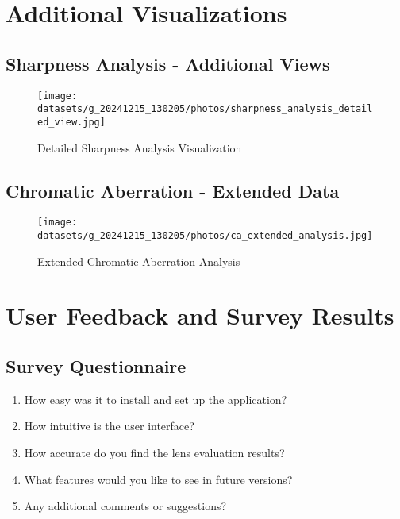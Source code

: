 
\chapter{Additional Visualizations}
\label{app:additional_visuals}

\section{Sharpness Analysis - Additional Views}
\begin{figure}[H]
    \centering
    \texttt{[image: datasets/g\_20241215\_130205/photos/sharpness\_analysis\_detailed\_view.jpg]}
    \caption{Detailed Sharpness Analysis Visualization}
    \label{fig:sharpness_detailed}
\end{figure}

\section{Chromatic Aberration - Extended Data}
\begin{figure}[H]
    \centering
    \texttt{[image: datasets/g\_20241215\_130205/photos/ca\_extended\_analysis.jpg]}
    \caption{Extended Chromatic Aberration Analysis}
    \label{fig:ca_extended}
\end{figure}


\chapter{User Feedback and Survey Results}
\label{app:user_feedback}

\section{Survey Questionnaire}
\begin{enumerate}
    \item How easy was it to install and set up the application?
    \item How intuitive is the user interface?
    \item How accurate do you find the lens evaluation results?
    \item What features would you like to see in future versions?
    \item Any additional comments or suggestions?
\end{enumerate}

